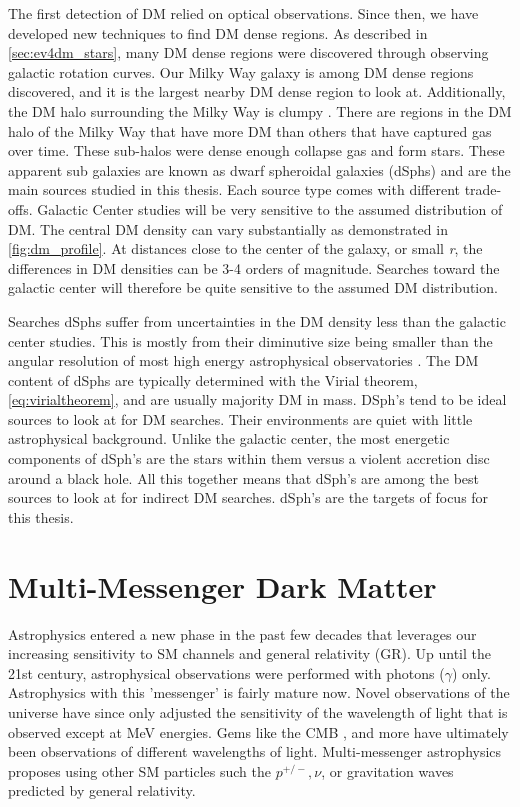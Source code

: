 The first detection of DM relied on optical observations.
Since then, we have developed new techniques to find DM dense regions.
As described in \cref{sec:ev4dm_stars}, many DM dense regions were discovered through observing galactic rotation curves.
Our Milky Way galaxy is among DM dense regions discovered, and it is the largest nearby DM dense region to look at.
Additionally, the DM halo surrounding the Milky Way is clumpy \cite{Tracy:les_houches}.
There are regions in the DM halo of the Milky Way that have more DM than others that have captured gas over time.
These sub-halos were dense enough collapse gas and form stars.
These apparent sub galaxies are known as dwarf spheroidal galaxies (dSphs) and are the main sources studied in this thesis.
Each source type comes with different trade-offs.
Galactic Center studies will be very sensitive to the assumed distribution of DM.
The central DM density can vary substantially as demonstrated in \cref{fig:dm_profile}.
At distances close to the center of the galaxy, or small \textit{r}, the differences in DM densities can be 3-4 orders of magnitude.
Searches toward the galactic center will therefore be quite sensitive to the assumed DM distribution.

Searches dSphs suffer from uncertainties in the DM density less than the galactic center studies.
This is mostly from their diminutive size being smaller than the angular resolution of most high energy astrophysical observatories \cite{Tracy:les_houches}.
The DM content of dSphs are typically determined with the Virial theorem, \cref{eq:virialtheorem}, and are usually majority DM \cite{Tracy:les_houches} in mass.
DSph's tend to be ideal sources to look at for DM searches.
Their environments are quiet with little astrophysical background.
Unlike the galactic center, the most energetic components of dSph's are the stars within them versus a violent accretion disc around a black hole.
All this together means that dSph's are among the best sources to look at for indirect DM searches.
dSph's are the targets of focus for this thesis.

\section{Multi-Messenger Dark Matter \label{sec:mult-messengerDM}}

Astrophysics entered a new phase in the past few decades that leverages our increasing sensitivity to SM channels and general relativity (GR).
Up until the 21st century, astrophysical observations were performed with photons ($\gamma$) only.
Astrophysics with this 'messenger' is fairly mature now.
Novel observations of the universe have since only adjusted the sensitivity of the wavelength of light that is observed except at MeV energies.
Gems like the CMB \cite{Plank:CMB}, and more have ultimately been observations of different wavelengths of light.
Multi-messenger astrophysics proposes using other SM particles such the $p^{+/-},  \nu$, or gravitation waves predicted by general relativity.

